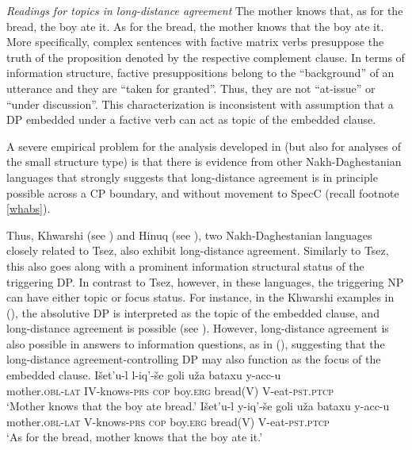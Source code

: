 \documentclass[output=paper
,modfonts
,nonflat]{langsci/langscibook}
\begin{document}
	\ea\label{ex:mueller:15} \textit{Readings for topics in long-distance agreement}
	\ea \label{embeddedtopicint}The mother knows that, as for the bread, the boy ate it.
	\ex \label{matrixtopicint}As for the bread, the mother knows that the boy ate it.
	\z
	\z
	More specifically, complex sentences with factive matrix verbs
	presuppose the truth of the proposition denoted by the respective
	complement clause. In terms of information structure, factive
	presuppositions belong to the ``background'' of an utterance and they
	are ``taken for granted''. Thus, they are not ``at-issue'' or ``under
	discussion''. This characterization is inconsistent with
	 assumption that a DP embedded under a factive verb
	can act as topic of the embedded clause.
	
	
	\noindent A severe empirical problem for the analysis developed in
	\cite{PolinskyPotsdam:01} (but also for analyses of the small
	structure type) is that there is evidence from other Nakh-Daghestanian
	languages that strongly suggests that long-distance agreement is in
	principle possible across a CP boundary, and without movement to SpecC
	(recall footnote \ref{whabs}). 
	
	Thus, Khwarshi (see
	\citealt{Khalilova09}) and Hinuq (see \citealt{Forker:11}), two
	Nakh-Daghe\-stanian languages closely related to Tsez,
	also exhibit long-distance agreement. Similarly to Tsez, this
	also goes along with a prominent information structural status of the
	triggering DP. In contrast to Tsez, however, in these languages, the
	triggering NP can have either topic or focus status.
	For instance, in the Khwarshi examples in (\Next), the 
	absolutive DP is interpreted as the topic of the embedded clause, and
	long-distance agreement is possible (see \citealt[387]{Khalilova09}).
	However, long-distance agreement is also possible in answers to
	information questions, as in (\NNext), suggesting that the
	long-distance agreement-controlling DP may also function as the focus of the embedded clause.
	\vspace{0.3cm}
	\ea\label{ex:mueller:16}
	\ea
	\gll I\v{s}et'u-l l-iq'-\v{s}e goli u\v{z}a bataxu y-acc-u \\
	mother.{\scshape obl-lat} IV-knows-{\scshape prs} {\scshape cop} boy.{\scshape erg} bread(V) V-eat-{\scshape pst.ptcp} \\
	\glt `Mother knows that the boy ate bread.'
	\ex  
	\gll I\v{s}et'u-l \label{16-b}y-iq'-\v{s}e goli u\v{z}a bataxu y-acc-u \\
	mother.{\scshape obl-lat} V-knows-{\scshape prs} {\scshape cop} boy.{\scshape erg}  bread(V) V-eat-{\scshape pst.ptcp} \\
	\glt `As for the bread, mother knows that  the boy ate it.'
	\z
	\z
	
\end{document}
